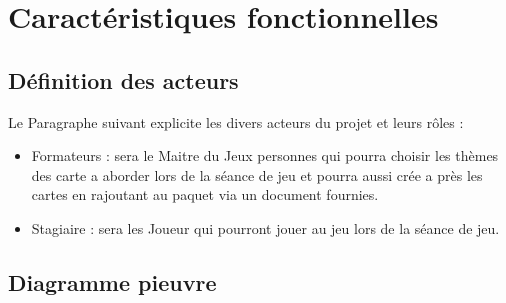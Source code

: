 \chapter{Caractéristiques fonctionnelles}

\section{Définition des acteurs}

Le Paragraphe suivant explicite les divers acteurs du projet et leurs rôles :
\begin{itemize}
	\item Formateurs : sera le Maitre du Jeux personnes qui pourra choisir les thèmes des carte a aborder lors de la séance de jeu et pourra aussi crée a près les cartes en rajoutant au paquet via un document fournies.
	\item Stagiaire : sera les Joueur qui pourront jouer au jeu lors de la séance de jeu. 
\end{itemize}

\section{Diagramme pieuvre}

